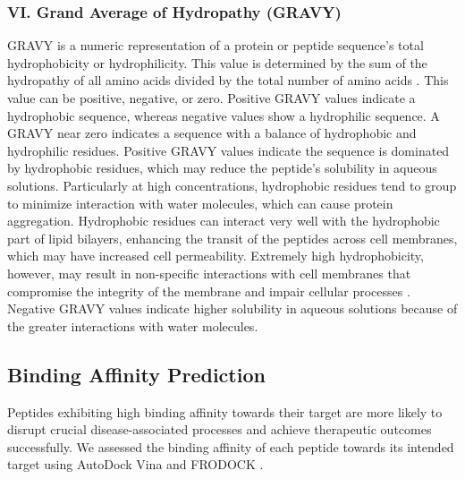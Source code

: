 \subsubsection*{VI. Grand Average of Hydropathy (GRAVY)}
GRAVY is a numeric representation of a protein or peptide sequence's total hydrophobicity or hydrophilicity. This value is determined by the sum of the hydropathy of all amino acids divided by the total number of amino acids \cite{kyte1982simple}. This value can be positive, negative, or zero. Positive GRAVY values indicate a hydrophobic sequence, whereas negative values show a hydrophilic sequence. A GRAVY near zero indicates a sequence with a balance of hydrophobic and hydrophilic residues. Positive GRAVY values indicate the sequence is dominated by hydrophobic residues, which may reduce the peptide's solubility in aqueous solutions. Particularly at high concentrations, hydrophobic residues tend to group to minimize interaction with water molecules, which can cause protein aggregation. Hydrophobic residues can interact very well with the hydrophobic part of lipid bilayers, enhancing the transit of the peptides across cell membranes, which may have increased cell permeability. Extremely high hydrophobicity, however, may result in non-specific interactions with cell membranes that compromise the integrity of the membrane and impair cellular processes \cite{kyte1982simple}. Negative GRAVY values indicate higher solubility in aqueous solutions because of the greater interactions with water molecules.

\subsection{Binding Affinity Prediction}
Peptides exhibiting high binding affinity towards their target are more likely to disrupt crucial disease-associated processes and achieve therapeutic outcomes successfully. We assessed the binding affinity of each peptide towards its intended target using AutoDock Vina \cite{trott2010autodock} and FRODOCK \cite{Aportela2016}.

